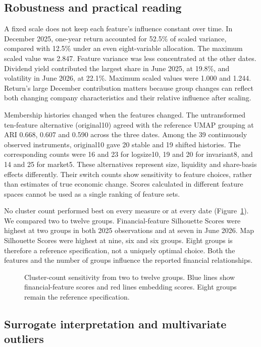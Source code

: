 \subsection{Robustness and practical reading}

A fixed scale does not keep each feature's influence constant over time. In December 2025, one-year return accounted for 52.5\% of scaled variance, compared with 12.5\% under an even eight-variable allocation. The maximum scaled value was 2.847. Feature variance was less concentrated at the other dates. Dividend yield contributed the largest share in June 2025, at 19.8\%, and volatility in June 2026, at 22.1\%. Maximum scaled values were 1.000 and 1.244. Return's large December contribution matters because group changes can reflect both changing company characteristics and their relative influence after scaling.

Membership histories changed when the features changed. The untransformed ten-feature alternative (original10) agreed with the reference UMAP grouping at ARI 0.668, 0.607 and 0.590 across the three dates. Among the 39 continuously observed instruments, original10 gave 20 stable and 19 shifted histories. The corresponding counts were 16 and 23 for logsize10, 19 and 20 for invariant8, and 14 and 25 for market5. These alternatives represent size, liquidity and share-basis effects differently. Their switch counts show sensitivity to feature choices, rather than estimates of true economic change. Scores calculated in different feature spaces cannot be used as a single ranking of feature sets.

No cluster count performed best on every measure or at every date (Figure~\ref{fig:cluster_count}). We compared two to twelve groups. Financial-feature Silhouette Scores were highest at two groups in both 2025 observations and at seven in June 2026. Map Silhouette Scores were highest at nine, six and six groups. Eight groups is therefore a reference specification, not a uniquely optimal choice. Both the features and the number of groups influence the reported financial relationships.

\begin{figure}[htbp]
\centering
{}
\caption{Cluster-count sensitivity from two to twelve groups. Blue lines show financial-feature scores and red lines embedding scores. Eight groups remain the reference specification.}\label{fig:cluster_count}
\end{figure}

\subsection{Surrogate interpretation and multivariate outliers}\label{sec:surrogate}

